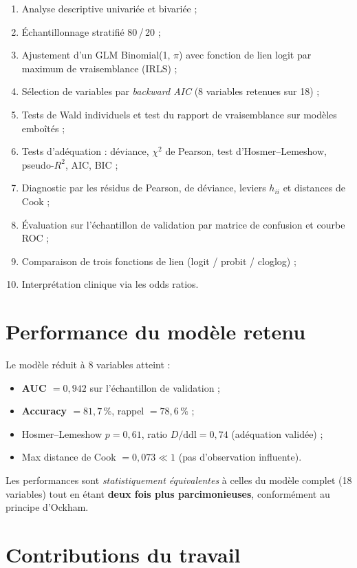 \documentclass[11pt,a4paper,twoside]{report}
\theoremstyle{definition}
\begin{document}
\begin{enumerate}\itemsep0.2em
  \item Analyse descriptive univariée et bivariée ;
  \item Échantillonnage stratifié 80\,/\,20 ;
  \item Ajustement d'un GLM Binomial(1, $\pi$) avec fonction de lien
    logit par maximum de vraisemblance (IRLS) ;
  \item Sélection de variables par \emph{backward AIC} (8 variables
    retenues sur 18) ;
  \item Tests de Wald individuels et test du rapport de vraisemblance
    sur modèles emboîtés ;
  \item Tests d'adéquation : déviance, $\chi^2$ de Pearson, test
    d'Hosmer--Lemeshow, pseudo-$R^2$, AIC, BIC ;
  \item Diagnostic par les résidus de Pearson, de déviance, leviers
    $h_{ii}$ et distances de Cook ;
  \item Évaluation sur l'échantillon de validation par matrice de
    confusion et courbe ROC ;
  \item Comparaison de trois fonctions de lien (logit / probit /
    cloglog) ;
  \item Interprétation clinique via les odds ratios.
\end{enumerate}

\section{Performance du modèle retenu}

Le modèle réduit à 8 variables atteint :
\begin{itemize}\itemsep0.2em
  \item \textbf{AUC $= 0{,}942$} sur l'échantillon de validation ;
  \item \textbf{Accuracy $= 81{,}7\,\%$}, rappel $= 78{,}6\,\%$ ;
  \item Hosmer--Lemeshow $p = 0{,}61$, ratio $D/\mathrm{ddl} = 0{,}74$
    (adéquation validée) ;
  \item Max distance de Cook $= 0{,}073 \ll 1$ (pas d'observation
    influente).
\end{itemize}

Les performances sont \emph{statistiquement équivalentes} à celles du
modèle complet (18 variables) tout en étant \textbf{deux fois plus
parcimonieuses}, conformément au principe d'Ockham.

\section{Contributions du travail}
\end{document}
